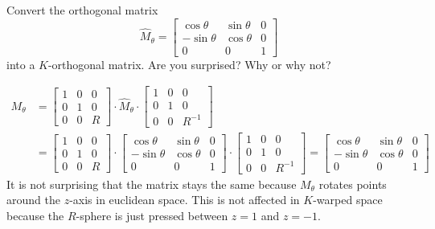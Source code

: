 \documentclass{ximera}
\begin{document}
\begin{problem}
  Convert the orthogonal matrix
  \[
  \hat{M}_\theta=\begin{bmatrix}
  \cos\theta & \sin\theta & 0\\
  -\sin\theta & \cos\theta & 0\\
  0 & 0 & 1
  \end{bmatrix}
  \]
  into a $K$-orthogonal matrix. Are you surprised? Why or why not?
  
\begin{freeResponse}
\begin{align*}
M_\theta &= \begin{bmatrix}
1 & 0 & 0\\
0 & 1 & 0\\
0 & 0 & R%
\end{bmatrix} \cdot \hat{M}_\theta \cdot
\begin{bmatrix}
1 & 0 & 0\\
0 & 1 & 0\\
0 & 0 & R^{-1}%
\end{bmatrix} \\
&= \begin{bmatrix}
1 & 0 & 0\\
0 & 1 & 0\\
0 & 0 & R%
\end{bmatrix} \cdot 
\begin{bmatrix}
  \cos\theta & \sin\theta & 0\\
  -\sin\theta & \cos\theta & 0\\
  0 & 0 & 1
  \end{bmatrix} \cdot
\begin{bmatrix}
1 & 0 & 0\\
0 & 1 & 0\\
0 & 0 & R^{-1}%
\end{bmatrix}
= \begin{bmatrix}
  \cos\theta & \sin\theta & 0\\
  -\sin\theta & \cos\theta & 0\\
  0 & 0 & 1
  \end{bmatrix} 
\end{align*} 
It is not surprising that the matrix stays the same because $M_\theta$ rotates points around the $z$-axis in euclidean space. This is not affected in $K$-warped space because the $R$-sphere is just pressed between $z=1$ and $z=-1$.
\end{freeResponse}

\end{problem}
\end{document}
